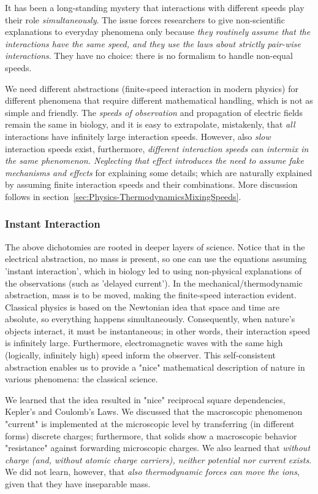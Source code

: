 It has been a long-standing mystery that interactions with different speeds play
their role \textit{simultaneously}. The issue forces researchers to give
non-scientific explanations to everyday phenomena only because \textit{they
routinely assume that the interactions have the same speed, and they use
the laws about strictly pair-wise interactions}. They have no choice: 
there is no formalism to handle non-equal speeds. 

We need different abstractions (finite-speed interaction in
modern physics) for different phenomena that require different mathematical
handling, which is not as simple and friendly. The \textit{speeds of
observation} and propagation of electric fields remain the same in
biology, and it is easy to extrapolate, mistakenly, that \textit{all}
interactions have infinitely large interaction speeds. However, also
\textit{slow} interaction speeds exist, furthermore, \textit{different interaction speeds
can intermix in the same phenomenon. Neglecting that effect introduces
the need to assume fake mechanisms and effects} for explaining
some details; which are naturally explained by assuming finite interaction
speeds and their combinations. More discussion follows in section~\ref{sec:Physics-ThermodynamicsMixingSpeeds}.

\subsubsection{Instant Interaction\label{sec:Physics-Instant}}


The above dichotomies are rooted in deeper layers of science.
Notice that in the electrical abstraction, no mass is present,
so one can use the equations assuming 'instant interaction',
which in biology led to using non-physical explanations of the observations (such as 'delayed current').
In the mechanical/thermodynamic abstraction, mass is to be moved, 
making the finite-speed interaction evident.
Classical physics is based on the Newtonian idea that space and time are absolute, so everything happens simultaneously. Consequently, when nature's objects
interact, it must be instantaneous; in other words, their
interaction speed is infinitely large. Furthermore, electromagnetic
waves with the same high (logically, infinitely high) speed inform the observer. This
self-consistent abstraction enables us to provide a "nice"
mathematical description of nature in various phenomena: the classical
science.

We learned that the idea resulted
in "nice" reciprocal square dependencies, Kepler's and Coulomb's
Laws. We discussed that the macroscopic phenomenon "current" is
implemented at the microscopic level by transferring (in different
forms) discrete charges; furthermore, that solids show a macroscopic
behavior "resistance" against forwarding microscopic charges. We also learned that \textit{without charge (and, without atomic charge carriers), neither potential nor current exists}. We did not learn, however,
that \textit{also thermodynamic forces can move the ions},
given that they have inseparable mass.


